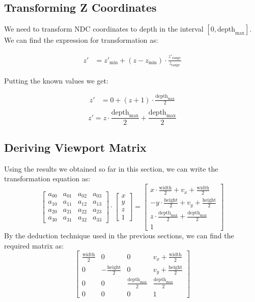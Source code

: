 \subsection{Transforming Z Coordinates}

We need to transform NDC coordinates to depth in the interval \([0,\text{depth}_{\max}]\).  
We can find the expression for transformation as:

\begin{align*}
z' &= z'_{\min} + (z - z_{\min}) \cdot \frac{z'_{\text{range}}}{z_{\text{range}}}
\end{align*}

Putting the known values we get:

\begin{align*}
z' &= 0 + (z + 1) \cdot \frac{\text{depth}_{\max}}{2} \\
\end{align*}
\begin{equation}
       z' = z \cdot \frac{\text{depth}_{\max}}{2} + \frac{\text{depth}_{\max}}{2}
\end{equation}
\subsection{Deriving Viewport Matrix}
Using the results we obtained so far in this section, we can write the transformation equation as:
\[
\begin{bmatrix}
a_{00} & a_{01} & a_{02} & a_{03} \\
a_{10} & a_{11} & a_{12} & a_{13} \\
a_{20} & a_{21} & a_{22} & a_{23} \\
a_{30} & a_{31} & a_{32} & a_{33}
\end{bmatrix}
\cdot
\begin{bmatrix}
x \\
y \\
z \\
1
\end{bmatrix}
=
\begin{bmatrix}
x \cdot \frac{\text{width}}{2} + v_x + \frac{\text{width}}{2}  \\
- y \cdot \frac{\text{height}}{2} + v_y + \frac{\text{height}}{2} \\
z \cdot \frac{\text{depth}_{\max}}{2} + \frac{\text{depth}_{\max}}{2} \\
1
\end{bmatrix}
\]
By the deduction technique used in the previous sections, we can find the required matrix as:
\begin{equation}
\begin{bmatrix}
\frac{\text{width}}{2} & 0 & 0 & v_x + \frac{\text{width}}{2} \\
0 & -\frac{\text{height}}{2} & 0 & v_y + \frac{\text{height}}{2} \\
0 & 0 & \frac{\text{depth}_{\max}}{2} & \frac{\text{depth}_{\max}}{2} \\
0 & 0 & 0 & 1
\end{bmatrix}
\end{equation}
